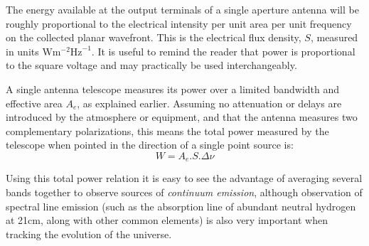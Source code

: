 The energy available at the output terminals of a single aperture antenna will be roughly proportional to the electrical intensity per unit area per unit frequency on the 
collected planar wavefront. This is the electrical flux density, $S$, measured in units $\text{W}\text{m}^{-2}\text{Hz}^{-1}$. It is useful to remind the reader that power is proportional to the square voltage and may 
practically be used interchangeably.

A single antenna telescope measures its power over a limited bandwidth and effective area $A_e$, as explained earlier. Assuming
no attenuation or delays are introduced by the atmosphere or equipment, and that the antenna measures two complementary polarizations, this 
means the total power measured by the telescope when pointed in the direction of a single point source is: 
\begin{equation*}
W = A_e.S.\Delta\nu
\end{equation*}

Using this total power relation it is easy to see the advantage of averaging several bands together to observe sources of \emph{continuum emission}, although
observation of spectral line emission (such as the absorption line of abundant neutral hydrogen at 21cm, along with other common elements) is also very 
important when tracking the evolution of the universe.

